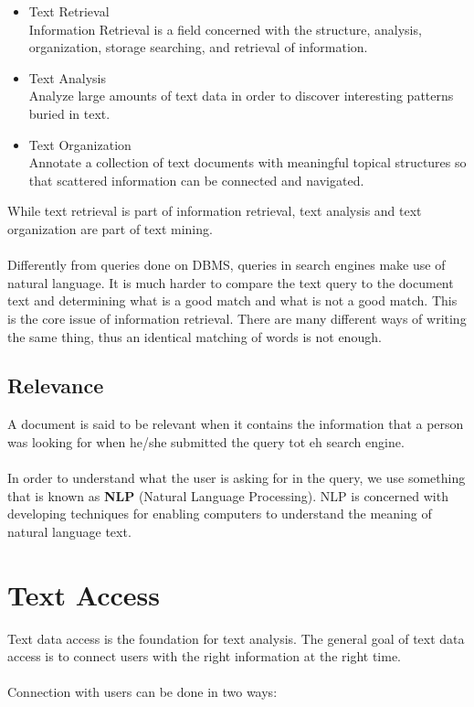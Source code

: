 \documentclass{article}
\begin{document}
\begin{itemize}
	\item Text Retrieval
	\vspace{.2cm} \\
	Information Retrieval is a field concerned with the structure, analysis, organization, storage searching, and retrieval of information.
	
	\item Text Analysis
	\vspace{.2cm} \\
	Analyze large amounts of text data in order to discover interesting patterns buried in text.
	
	\item Text Organization
	\vspace{.2cm} \\
	Annotate a collection of text documents with meaningful topical structures so that scattered information can be connected and navigated.
\end{itemize}
While text retrieval is part of information retrieval, text analysis and text organization are part of text mining. \\ \\
Differently from queries done on DBMS, queries in search engines make use of natural language. It is much harder to compare the text query to the document text and determining what is a good match and what is not a good match. This is the core issue of information retrieval. There are many different ways of writing the same thing, thus an identical matching of words is not enough.

\subsection{Relevance}
A document is said to be relevant when it contains the information that a person was looking for when he/she submitted the query tot eh search engine.\\ \\
In order to understand what the user is asking for in the query, we use something that is known as \textbf{NLP} (Natural Language Processing). NLP is concerned with developing techniques for enabling computers to understand the meaning of natural language text.

\section{Text Access}
Text data access is the foundation for text analysis. The general goal of text data access is to connect users with the right information at the right time. \\ \\
Connection with users can be done in two ways:
\end{document}
